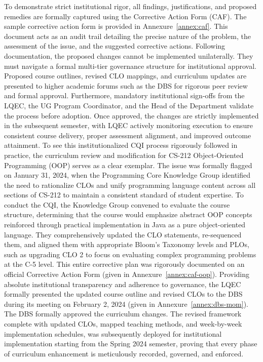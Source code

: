 To demonstrate strict institutional rigor, all findings, justifications, and proposed remedies are formally captured using the Corrective Action Form (CAF). The sample corrective action form is provided in Annexure~\ref{annex:caf}. This document acts as an audit trail detailing the precise nature of the problem, the assessment of the issue, and the suggested corrective actions. Following documentation, the proposed changes cannot be implemented unilaterally. They must navigate a formal multi-tier governance structure for institutional approval. Proposed course outlines, revised CLO mappings, and curriculum updates are presented to higher academic forums such as the DBS for rigorous peer review and formal approval. Furthermore, mandatory institutional sign-offs from the LQEC, the UG Program Coordinator, and the Head of the Department validate the process before adoption. Once approved, the changes are strictly implemented in the subsequent semester, with LQEC actively monitoring execution to ensure consistent course delivery, proper assessment alignment, and improved outcome attainment. To see this institutionalized CQI process rigorously followed in practice, the curriculum review and modification for CS-212 Object-Oriented Programming (OOP) serves as a clear exemplar. The issue was formally flagged on January 31, 2024, when the Programming Core Knowledge Group identified the need to rationalize CLOs and unify programming language content across all sections of CS-212 to maintain a consistent standard of student expertise. To conduct the CQI, the Knowledge Group convened to evaluate the course structure, determining that the course would emphasize abstract OOP concepts reinforced through practical implementation in Java as a pure object-oriented language. They comprehensively updated the CLO statements, re-sequenced them, and aligned them with appropriate Bloom's Taxonomy levels and PLOs, such as upgrading CLO 2 to focus on evaluating complex programming problems at the C-5 level. This entire corrective plan was rigorously documented on an official Corrective Action Form (given in Annexure~\ref{annex:caf-oop}). Providing absolute institutional transparency and adherence to governance, the LQEC formally presented the updated course outline and revised CLOs to the DBS during its meeting on February 2, 2024 (given in Annexure~\ref{annex:dbs-mom}). The DBS formally approved the curriculum changes. The revised framework complete with updated CLOs, mapped teaching methods, and week-by-week implementation schedules, was subsequently deployed for institutional implementation starting from the Spring 2024 semester, proving that every phase of curriculum enhancement is meticulously recorded, governed, and enforced. 

